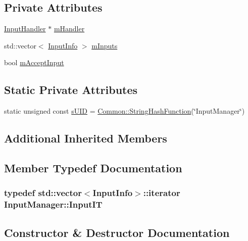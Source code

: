 \subsection*{Private Attributes}
\begin{DoxyCompactItemize}
\item 
\hyperlink{classInputHandler}{Input\+Handler} $\ast$ \hyperlink{classInputManager_ab291f66f6227aa05357165ffedd2f634}{m\+Handler}
\item 
std\+::vector$<$ \hyperlink{structInputInfo}{Input\+Info} $>$ \hyperlink{classInputManager_a639dfcc7c198f880217f667a48d99804}{m\+Inputs}
\item 
bool \hyperlink{classInputManager_acd38734c7f9faa6538868dff713a4bf6}{m\+Accept\+Input}
\end{DoxyCompactItemize}
\subsection*{Static Private Attributes}
\begin{DoxyCompactItemize}
\item 
static unsigned const \hyperlink{classInputManager_a0615dfbe325cf0af3708b9f8bdf22669}{s\+U\+ID} = \hyperlink{namespaceCommon_a994c43a8ea7b03968186a635687a6521}{Common\+::\+String\+Hash\+Function}(\char`\"{}Input\+Manager\char`\"{})
\end{DoxyCompactItemize}
\subsection*{Additional Inherited Members}


\subsection{Member Typedef Documentation}
\subsubsection[{\texorpdfstring{Input\+IT}{InputIT}}]{\setlength{\rightskip}{0pt plus 5cm}typedef std\+::vector$<${\bf Input\+Info}$>$\+::iterator {\bf Input\+Manager\+::\+Input\+IT}}\hypertarget{classInputManager_a97ddfabc7a35e32edf633e568a728879}{}\label{classInputManager_a97ddfabc7a35e32edf633e568a728879}


\subsection{Constructor \& Destructor Documentation}
